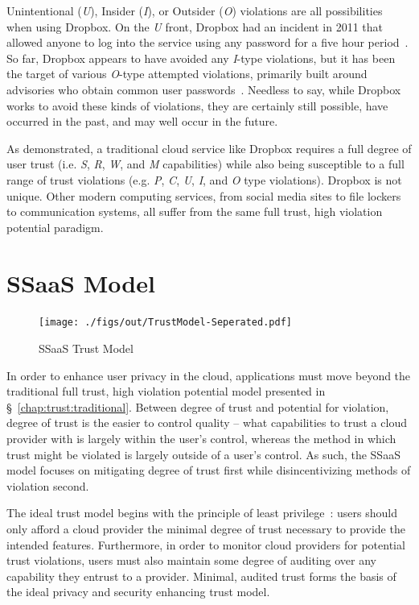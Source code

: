 Unintentional (\emph{U}), Insider (\emph{I}), or Outsider (\emph{O})
violations are all possibilities when using Dropbox. On the \emph{U}
front, Dropbox had an incident in 2011 that allowed anyone to log into
the service using any password for a five hour
period~\cite{dropbox-authbug}. So far, Dropbox appears to have
avoided any \emph{I}-type violations, but it has been the target of
various \emph{O}-type attempted violations, primarily built around
advisories who obtain common user
passwords~\cite{dropbox-passwords}. Needless to say, while Dropbox
works to avoid these kinds of violations, they are certainly still
possible, have occurred in the past, and may well occur in the future.

As demonstrated, a traditional cloud service like Dropbox requires a
full degree of user trust (i.e. \emph{S}, \emph{R}, \emph{W}, and
\emph{M} capabilities) while also being susceptible to a full range of
trust violations (e.g. \emph{P}, \emph{C}, \emph{U}, \emph{I}, and
\emph{O} type violations). Dropbox is not unique. Other modern
computing services, from social media sites to file lockers to
communication systems, all suffer from the same full trust,
high violation potential paradigm.

\section{SSaaS Model}
\label{chap:trust:ssaas}

\begin{figure}[t]
  \centering
  \texttt{[image: ./figs/out/TrustModel-Seperated.pdf]}
  \caption{SSaaS Trust Model}
  \label{fig:trust-ssaas}
\end{figure}

In order to enhance user privacy in the cloud, applications must move
beyond the traditional full trust, high violation potential model
presented in \S~\ref{chap:trust:traditional}. Between degree of trust
and potential for violation, degree of trust is the easier to control
quality -- what capabilities to trust a cloud provider with is largely
within the user's control, whereas the method in which trust might be
violated is largely outside of a user's control. As such, the SSaaS
model focuses on mitigating degree of trust first while
disincentivizing methods of violation second.

The ideal trust model begins with the principle of least
privilege~\cite{saltzer1975}: users should only afford a cloud
provider the minimal degree of trust necessary to provide the intended
features. Furthermore, in order to monitor cloud providers for
potential trust violations, users must also maintain some degree of
auditing over any capability they entrust to a provider. Minimal,
audited trust forms the basis of the ideal privacy and security
enhancing trust model.

